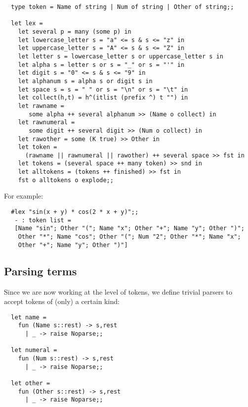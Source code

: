 \begin{boxed}\begin{verbatim}
  type token = Name of string | Num of string | Other of string;;

  let lex =
    let several p = many (some p) in
    let lowercase_letter s = "a" <= s & s <= "z" in
    let uppercase_letter s = "A" <= s & s <= "Z" in
    let letter s = lowercase_letter s or uppercase_letter s in
    let alpha s = letter s or s = "_" or s = "'" in
    let digit s = "0" <= s & s <= "9" in
    let alphanum s = alpha s or digit s in
    let space s = s = " " or s = "\n" or s = "\t" in
    let collect(h,t) = h^(itlist (prefix ^) t "") in
    let rawname =
       some alpha ++ several alphanum >> (Name o collect) in
    let rawnumeral =
       some digit ++ several digit >> (Num o collect) in
    let rawother = some (K true) >> Other in
    let token =
      (rawname || rawnumeral || rawother) ++ several space >> fst in
    let tokens = (several space ++ many token) >> snd in
    let alltokens = (tokens ++ finished) >> fst in
    fst o alltokens o explode;;
\end{verbatim}\end{boxed}

\noindent For example:

\begin{boxed}\begin{verbatim}
  #lex "sin(x + y) * cos(2 * x + y)";;
   - : token list =
   [Name "sin"; Other "("; Name "x"; Other "+"; Name "y"; Other ")";
    Other "*"; Name "cos"; Other "("; Num "2"; Other "*"; Name "x";
    Other "+"; Name "y"; Other ")"]
\end{verbatim}\end{boxed}

\subsection{Parsing terms}

Since we are now working at the level of tokens, we define trivial parsers to
accept tokens of (only) a certain kind:

\begin{boxed}\begin{verbatim}
  let name =
    fun (Name s::rest) -> s,rest
      | _ -> raise Noparse;;

  let numeral =
    fun (Num s::rest) -> s,rest
      | _ -> raise Noparse;;

  let other =
    fun (Other s::rest) -> s,rest
      | _ -> raise Noparse;;
\end{verbatim}\end{boxed}

